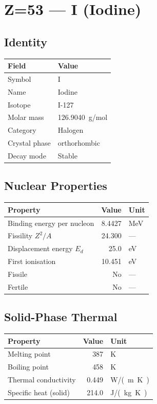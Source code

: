 \documentclass[11pt,a4paper]{article}
\begin{document}
\newpage

\section{Z=53 --- I (Iodine)}
\label{sec:Z53}

\subsection{Identity}
\begin{tabular}{ll}
  \toprule
  Field & Value \\
  \midrule
  Symbol & I \\
  Name & Iodine \\
  Isotope & I-127 \\
  Molar mass & \SI{126.9040}{g/mol} \\
  Category & Halogen \\
  Crystal phase & orthorhombic \\
  Decay mode & Stable \\
  \bottomrule
\end{tabular}

\subsection{Nuclear Properties}
\begin{tabular}{lrl}
  \toprule
  Property & Value & Unit \\
  \midrule
  Binding energy per nucleon & 8.4427 & \si{MeV} \\
  Fissility $Z^2/A$ & 24.300 & --- \\
  Displacement energy $E_d$ & 25.0 & \si{eV} \\
  First ionisation & 10.451 & \si{eV} \\
  Fissile & No & --- \\
  Fertile & No & --- \\
  \bottomrule
\end{tabular}

\subsection{Solid-Phase Thermal}
\begin{tabular}{lrl}
  \toprule
  Property & Value & Unit \\
  \midrule
  Melting point & 387 & \si{K} \\
  Boiling point & 458 & \si{K} \\
  Thermal conductivity & 0.449 & \si{W/(m.K)} \\
  Specific heat (solid) & 214.0 & \si{J/(kg.K)} \\
  \bottomrule
\end{tabular}
\end{document}
